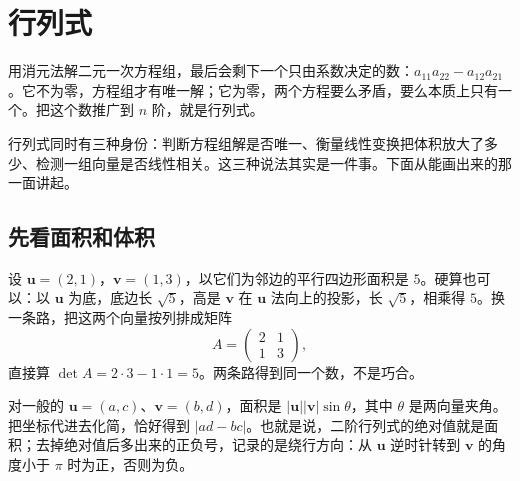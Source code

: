\section{行列式}

用消元法解二元一次方程组，最后会剩下一个只由系数决定的数：$a_{11}a_{22}-a_{12}a_{21}$。它不为零，方程组才有唯一解；它为零，两个方程要么矛盾，要么本质上只有一个。把这个数推广到 $n$ 阶，就是行列式。

行列式同时有三种身份：判断方程组解是否唯一、衡量线性变换把体积放大了多少、检测一组向量是否线性相关。这三种说法其实是一件事。下面从能画出来的那一面讲起。

\subsection{先看面积和体积}

设 $\boldsymbol{u}=(2,1)$，$\boldsymbol{v}=(1,3)$，以它们为邻边的平行四边形面积是 $5$。硬算也可以：以 $\boldsymbol{u}$ 为底，底边长 $\sqrt5$，高是 $\boldsymbol{v}$ 在 $\boldsymbol{u}$ 法向上的投影，长 $\sqrt5$，相乘得 $5$。换一条路，把这两个向量按列排成矩阵
\[
A=\begin{pmatrix}2&1\\1&3\end{pmatrix},
\]
直接算 $\det A=2\cdot3-1\cdot1=5$。两条路得到同一个数，不是巧合。

对一般的 $\boldsymbol{u}=(a,c)$、$\boldsymbol{v}=(b,d)$，面积是 $|\boldsymbol{u}||\boldsymbol{v}|\sin\theta$，其中 $\theta$ 是两向量夹角。把坐标代进去化简，恰好得到 $|ad-bc|$。也就是说，二阶行列式的绝对值就是面积；去掉绝对值后多出来的正负号，记录的是绕行方向：从 $\boldsymbol{u}$ 逆时针转到 $\boldsymbol{v}$ 的角度小于 $\pi$ 时为正，否则为负。

